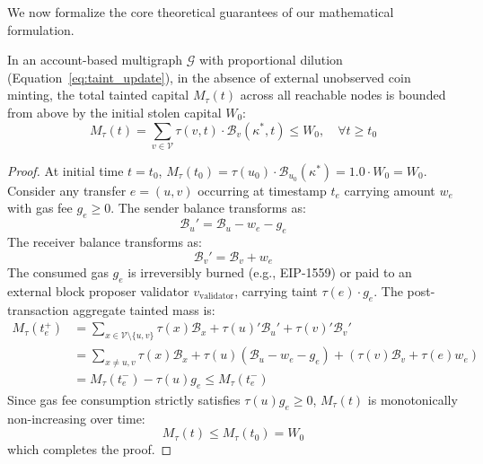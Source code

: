 We now formalize the core theoretical guarantees of our mathematical formulation.

\begin{theorem}
\label{thm:conservation}
In an account-based multigraph $\mathcal{G}$ with proportional dilution (Equation~\ref{eq:taint_update}), in the absence of external unobserved coin minting, the total tainted capital $M_{\tau}(t)$ across all reachable nodes is bounded from above by the initial stolen capital $W_0$:
\begin{equation}
    M_{\tau}(t) = \sum_{v \in \mathcal{V}} \tau(v, t) \cdot \mathcal{B}_v(\kappa^*, t) \le W_0, \quad \forall t \ge t_0
\end{equation}
\end{theorem}

\begin{proof}
At initial time $t = t_0$, $M_{\tau}(t_0) = \tau(u_0) \cdot \mathcal{B}_{u_0}(\kappa^*) = 1.0 \cdot W_0 = W_0$.
Consider any transfer $e = (u, v)$ occurring at timestamp $t_e$ carrying amount $w_e$ with gas fee $g_e \ge 0$.
The sender balance transforms as:
\begin{equation}
    \mathcal{B}_u' = \mathcal{B}_u - w_e - g_e
\end{equation}
The receiver balance transforms as:
\begin{equation}
    \mathcal{B}_v' = \mathcal{B}_v + w_e
\end{equation}
The consumed gas $g_e$ is irreversibly burned (e.g., EIP-1559) or paid to an external block proposer validator $v_{\text{validator}}$, carrying taint $\tau(e) \cdot g_e$.
The post-transaction aggregate tainted mass is:
\begin{align*}
    M_{\tau}(t_e^+) &= \sum_{x \in \mathcal{V} \setminus \{u, v\}} \tau(x)\mathcal{B}_x + \tau(u)'\mathcal{B}_u' + \tau(v)'\mathcal{B}_v' \\
    &= \sum_{x \ne u, v} \tau(x)\mathcal{B}_x + \tau(u)(\mathcal{B}_u - w_e - g_e) + (\tau(v)\mathcal{B}_v + \tau(e)w_e) \\
    &= M_{\tau}(t_e^-) - \tau(u)g_e \le M_{\tau}(t_e^-)
\end{align*}
Since gas fee consumption strictly satisfies $\tau(u)g_e \ge 0$, $M_{\tau}(t)$ is monotonically non-increasing over time:
\begin{equation}
    M_{\tau}(t) \le M_{\tau}(t_0) = W_0
\end{equation}
which completes the proof.
\end{proof}

